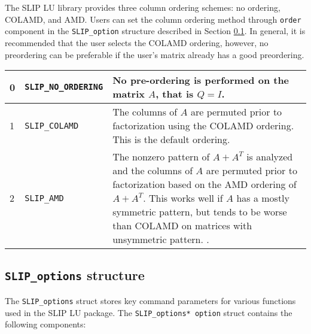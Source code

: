 \documentclass[12pt]{article}
\theoremstyle{definition}
\begin{document}
The SLIP LU library provides three column ordering schemes: no ordering,
COLAMD, and AMD. Users can set the column ordering method through \verb|order|
component in the \verb|SLIP_option| structure described in Section
\ref{ss:SLIP_options}. In general, it is recommended that the user selects the
COLAMD ordering, however, no preordering can be preferable if the user's matrix
already has a good preordering.

{\small
\begin{center}
\begin{tabular}{llp{4in}}
\hline
0 & \verb|SLIP_NO_ORDERING| & No pre-ordering is performed on the matrix $A$,
                              that is $Q = I$. \\
\hline
1 & \verb|SLIP_COLAMD|      & The columns of $A$ are permuted prior to
                              factorization using the COLAMD
                              \cite{davis2004algorithmcolamd} ordering.
                              This is the default ordering. \\
\hline
2 & \verb|SLIP_AMD|         & The nonzero pattern of $A + A^T$ is analyzed and
                              the columns of $A$ are permuted prior to
                              factorization based on the AMD
                              \cite{amestoy2004algorithmamd} ordering of
                              $A+A^T$. This works well if $A$ has a mostly
                              symmetric pattern, but tends to be worse
                              than COLAMD on matrices with unsymmetric pattern.
                              \cite{davis2004column}.\\
\hline
\end{tabular}
\label{tab:SLIP_pivot}
\end{center}
}

\cprotect\subsection{ \verb|SLIP_options| structure}
\label{ss:SLIP_options}

The \verb|SLIP_options| struct stores key command parameters for various
functions used in the SLIP LU package. The \verb|SLIP_options* option| struct
contains the following components:
\end{document}
